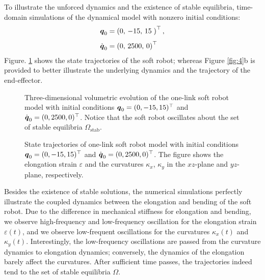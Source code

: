 To illustrate the unforced dynamics and the existence of stable equilibria, time-domain simulations of the dynamical model with nonzero initial conditions:
%
\begin{align*}
{\boldsymbol{q}}_0 & = \left(0,\,-15,\,15\; \right)^\top, \\[0.35em] {\dot{\boldsymbol{q}}}_0 & = \left(0,\,2500,\,0 \right)^\top
\end{align*}
%
Figure. \ref{fig:C2:natural_states} shows the state trajectories of the soft robot; whereas Figure \ref{fig:4}b is provided to better illustrate the underlying dynamics and the trajectory of the end-effector.
%
\begin{figure}[!t]
  \vspace{-5mm}
  \centering
  
  \vspace{-3mm}
  \caption{Three-dimensional volumetric evolution of the one-link soft robot model with initial conditions ${\boldsymbol{q}}_0 = (0 , -15, 15)^\top$ and ${\dot{\boldsymbol{q}}}_0 = (0, 2500, 0)^\top$. Notice that the soft robot oscillates about the set of stable equilibria $\Omega_{\textrm{stab}}$. }
  \label{fig:C2:natural_states}
\end{figure}
%
%
\begin{figure}[!t]
  \centering
  
  \vspace{-3mm}
  \caption{State trajectories of one-link soft robot model with initial conditions ${\boldsymbol{q}}_0 = (0 , -15, 15)^\top$ and ${\dot{\boldsymbol{q}}}_0 = (0, 2500, 0)^\top$. The figure shows the elongation strain $\varepsilon$ and the curvatures $\kappa_x$, $\kappa_y$ in the $xz$-plane and $yz$-plane, respectively.}
  \label{fig:C2:natural_3D}
\end{figure}
%
Besides the existence of stable solutions, the numerical simulations perfectly illustrate the coupled dynamics between the elongation and bending of the soft robot. Due to the difference in mechanical stiffness for elongation and bending, we observe high-frequency and low-frequency oscillation for the elongation strain $\varepsilon(t)$, and we observe low-frequent oscillations for the curvatures $\kappa_x(t)$ and $\kappa_y(t)$. Interestingly, the low-frequency oscillations are passed from the curvature dynamics to elongation dynamics; conversely, the dynamics of the elongation barely affect the curvatures. After sufficient time passes, the trajectories indeed tend to the set of stable equilibria $\Omega$.

